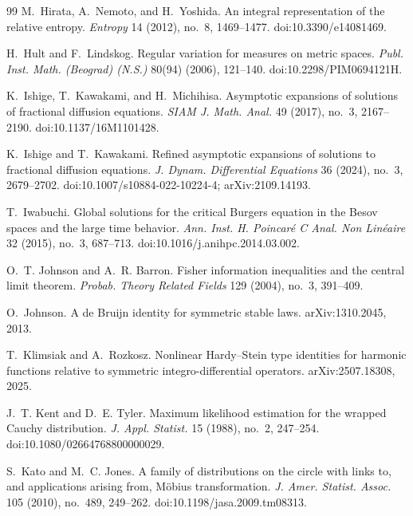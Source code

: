 \begin{thebibliography}{99}
M.~Hirata, A.~Nemoto, and H.~Yoshida.
\newblock An integral representation of the relative entropy.
\newblock \emph{Entropy} 14 (2012), no.~8, 1469--1477.
\newblock doi:10.3390/e14081469.

H.~Hult and F.~Lindskog.
\newblock Regular variation for measures on metric spaces.
\newblock \emph{Publ. Inst. Math. (Beograd) (N.S.)} 80(94) (2006), 121--140.
\newblock doi:10.2298/PIM0694121H.

K.~Ishige, T.~Kawakami, and H.~Michihisa.
\newblock Asymptotic expansions of solutions of fractional diffusion
equations.
\newblock \emph{SIAM J. Math. Anal.} 49 (2017), no.~3, 2167--2190.
\newblock doi:10.1137/16M1101428.

K.~Ishige and T.~Kawakami.
\newblock Refined asymptotic expansions of solutions to fractional diffusion
equations.
\newblock \emph{J. Dynam. Differential Equations} 36 (2024), no.~3,
2679--2702.
\newblock doi:10.1007/s10884-022-10224-4; arXiv:2109.14193.

T.~Iwabuchi.
\newblock Global solutions for the critical Burgers equation in the Besov
spaces and the large time behavior.
\newblock \emph{Ann. Inst. H. Poincar{\'e} C Anal. Non Lin{\'e}aire}
32 (2015), no.~3, 687--713.
\newblock doi:10.1016/j.anihpc.2014.03.002.

O.~T. Johnson and A.~R. Barron.
\newblock Fisher information inequalities and the central limit theorem.
\newblock \emph{Probab. Theory Related Fields} 129 (2004), no.~3, 391--409.

O.~Johnson.
\newblock A de Bruijn identity for symmetric stable laws.
\newblock arXiv:1310.2045, 2013.

T.~Klimsiak and A.~Rozkosz.
\newblock Nonlinear Hardy--Stein type identities for harmonic functions
relative to symmetric integro-differential operators.
\newblock arXiv:2507.18308, 2025.

J.~T. Kent and D.~E. Tyler.
\newblock Maximum likelihood estimation for the wrapped Cauchy distribution.
\newblock \emph{J. Appl. Statist.} 15 (1988), no.~2, 247--254.
\newblock doi:10.1080/02664768800000029.

S.~Kato and M.~C. Jones.
\newblock A family of distributions on the circle with links to, and
applications arising from, M{\"o}bius transformation.
\newblock \emph{J. Amer. Statist. Assoc.} 105 (2010), no.~489, 249--262.
\newblock doi:10.1198/jasa.2009.tm08313.


\end{thebibliography}
